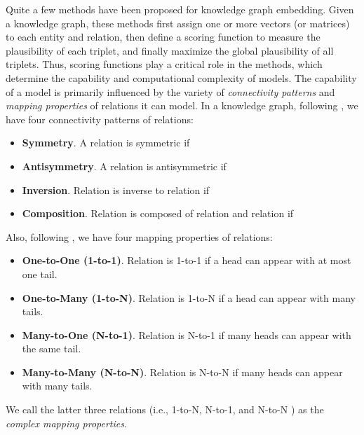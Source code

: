 \documentclass[conference]{IEEEtran}
\begin{document}
Quite a few methods \cite{TransE,ComplEx,ConvE,RotatE,paths,simple} have been proposed for knowledge graph embedding. Given a knowledge graph, these methods first assign one or more vectors (or matrices) to each entity and relation, then define a scoring function  to measure the plausibility of each triplet, and finally maximize the global plausibility of all triplets. Thus, scoring functions play a critical role in the methods, which determine the capability and computational complexity of models. The capability of a model is primarily influenced by the variety of \textit{connectivity patterns} and \textit{mapping properties} of relations it can model. In a knowledge graph, following \cite{RotatE}, we have four connectivity patterns of relations:
\begin{itemize}
	\item \textbf{Symmetry}. A relation  is symmetric if
	\begin{center}
		
	\end{center}
	\item \textbf{Antisymmetry}. A relation  is antisymmetric if 
	\begin{center}
		
	\end{center}
	\item \textbf{Inversion}. Relation  is inverse to relation  if
	\begin{center}
		
	\end{center}
	\item \textbf{Composition}. Relation  is composed of relation  and relation  if
	\begin{center}
		
	\end{center}
\end{itemize}
Also, following \cite{TransE}, we have four mapping properties of relations:
\begin{itemize}
	\item \textbf{One-to-One (1-to-1)}. Relation  is 1-to-1 if a head can appear with at most one tail.
	\item \textbf{One-to-Many (1-to-N)}. Relation  is 1-to-N if a head can appear with many tails.
	\item \textbf{Many-to-One (N-to-1)}. Relation  is N-to-1 if many heads can appear with the same tail.
	\item \textbf{Many-to-Many (N-to-N)}. Relation  is N-to-N if many heads can appear with many tails.
\end{itemize}
We call the latter three relations (i.e., 1-to-N, N-to-1, and N-to-N ) as the \textit{complex mapping properties}.
\end{document}
